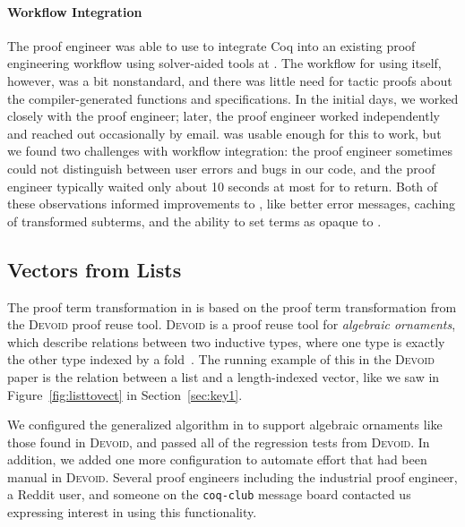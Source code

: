 \paragraph{Workflow Integration}
The proof engineer was able to use \toolname to integrate Coq into an existing proof engineering
workflow using solver-aided tools at \company.
The workflow for using \toolname itself, however, was a bit nonstandard,
and there was little need for tactic proofs about the compiler-generated functions and specifications.
In the initial days, we worked closely with the proof engineer;
later, the proof engineer worked independently and reached out occasionally by email.
\toolname was usable enough for this to work, but we found two challenges with workflow integration:
the proof engineer sometimes could not distinguish between user errors and bugs in our code,
and the proof engineer typically waited only about 10 seconds at most for \toolname to return.
Both of these observations informed improvements to \toolname, like better error messages, caching of transformed subterms,
and the ability to set terms as opaque to \toolname.

\subsection{Vectors from Lists}
\label{sec:dep}

The proof term transformation in \toolname is based on the proof term transformation from
the \textsc{Devoid} proof reuse tool.
\textsc{Devoid} is a proof reuse tool for \textit{algebraic ornaments}, which describe relations
between two inductive types, where one type is exactly the other type indexed by a fold~\cite{mcbride}.
The running example of this in the \textsc{Devoid} paper is the relation between a list and a
length-indexed vector, like we saw in Figure~\ref{fig:listtovect} in Section~\ref{sec:key1}.

We configured the generalized algorithm in \toolname to support algebraic ornaments like those found in \textsc{Devoid},
and passed all of the regression tests from \textsc{Devoid}.
In addition, we added one more configuration to automate effort that had been manual in \textsc{Devoid}.
Several proof engineers including the industrial proof engineer, a Reddit user,
and someone on the \lstinline{coq-club} message board contacted us expressing interest in using this functionality.


